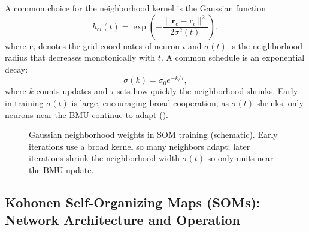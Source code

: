 A common choice for the neighborhood kernel is the Gaussian function
\begin{equation}
    h_{ci}(t) = \exp\left(-\frac{\| \mathbf{r}_c - \mathbf{r}_i \|^2}{2\sigma^2(t)}\right),
    \label{eq:gaussian_neighborhood_short}
\end{equation}
where $\mathbf{r}_i$ denotes the grid coordinates of neuron $i$ and $\sigma(t)$ is the neighborhood radius that decreases monotonically with $t$. A common schedule is an exponential decay:
\begin{equation}
    \sigma(k) = \sigma_0 e^{-k/\tau},
    \label{eq:som_sigma_schedule}
\end{equation}
where $k$ counts updates and $\tau$ sets how quickly the neighborhood shrinks. Early in training $\sigma(t)$ is large, encouraging broad cooperation; as $\sigma(t)$ shrinks, only neurons near the BMU continue to adapt ().
\begin{figure}[t]
    \centering
    \caption{Gaussian neighborhood weights in SOM training (schematic). Early iterations use a broad kernel so many neighbors adapt; later iterations shrink the neighborhood width \(\sigma(t)\) so only units near the BMU update.}
    \label{fig:lec5-gaussian-neighborhood}
\end{figure}



\subsection{Kohonen Self-Organizing Maps (SOMs): Network Architecture and Operation}
\label{sec:som_kohonen_self_organizing_maps_soms_network_architecture_and_operation}

